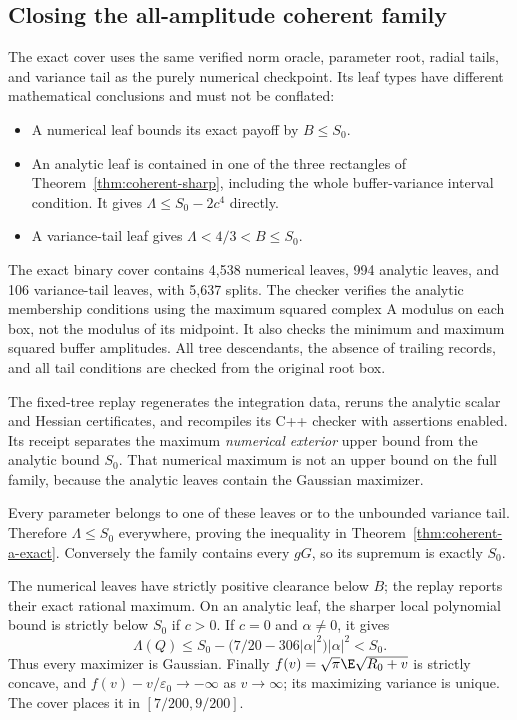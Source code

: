 \subsection{Closing the all-amplitude coherent family}
The exact cover uses the same verified norm oracle, parameter root,
radial tails, and variance tail as the purely numerical checkpoint.
Its leaf types have different mathematical conclusions and must not
be conflated:
\begin{itemize}
\item A numerical leaf bounds its exact payoff by $B\le S_0$.
\item An analytic leaf is contained in one of the three rectangles of
Theorem~\ref{thm:coherent-sharp}, including the whole buffer-variance
interval condition. It gives $\Lambda\le S_0-2c^4$ directly.
\item A variance-tail leaf gives $\Lambda<4/3<B\le S_0$.
\end{itemize}
The exact binary cover contains 4,538 numerical leaves, 994 analytic
leaves, and 106 variance-tail leaves, with 5,637 splits. The checker
verifies the analytic membership conditions using the maximum squared
complex A modulus on each box, not the modulus of its midpoint. It
also checks the minimum and maximum squared buffer amplitudes. All
tree descendants, the absence of trailing records, and all tail
conditions are checked from the original root box.

The fixed-tree replay regenerates the integration data, reruns the
analytic scalar and Hessian certificates, and recompiles its C++
checker with assertions enabled. Its receipt separates the maximum
\emph{numerical exterior} upper bound from the analytic bound $S_0$.
That numerical maximum is not an upper bound on the full family,
because the analytic leaves contain the Gaussian maximizer.

Every parameter belongs to one of these leaves or to the unbounded
variance tail. Therefore $\Lambda\le S_0$ everywhere, proving the
inequality in Theorem~\ref{thm:coherent-a-exact}. Conversely the family
contains every $gG$, so its supremum is exactly $S_0$.

The numerical leaves have strictly positive clearance below $B$;
the replay reports their exact rational maximum. On an analytic leaf,
the sharper local polynomial bound is strictly below $S_0$ if $c>0$.
If $c=0$ and $\alpha\ne0$, it gives
\[
 \Lambda(Q)\le S_0-\bigl(7/20-306|\alpha|^2\bigr)|\alpha|^2<S_0.
\]
Thus every maximizer is Gaussian. Finally
$f(v)=\sqrt\pi\E\sqrt{R_0+v}$ is strictly concave, and
$f(v)-v/\varepsilon_0\to-\infty$ as $v\to\infty$; its maximizing
variance is unique. The cover places it in $[7/200,9/200]$.

